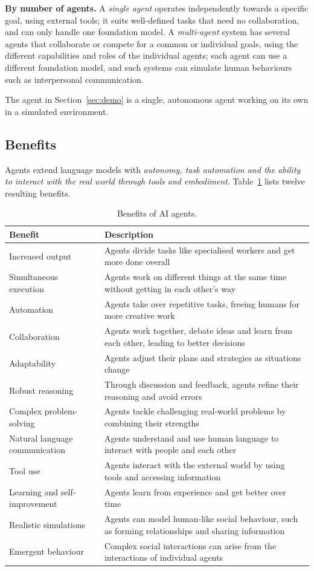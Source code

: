 \documentclass[11pt, a4paper]{article}
\begin{document}
\textbf{By number of agents.} A \emph{single agent} operates independently towards a specific goal, using external tools; it suits well-defined tasks that need no collaboration, and can only handle one foundation model. A \emph{multi-agent} system has several agents that collaborate or compete for a common or individual goals, using the different capabilities and roles of the individual agents; each agent can use a different foundation model, and such systems can simulate human behaviours such as interpersonal communication.

The agent in Section~\ref{sec:demo} is a single, autonomous agent working on its own in a simulated environment.

\subsection{Benefits}

Agents extend language models with \emph{autonomy, task automation and the ability to interact with the real world through tools and embodiment}. Table~\ref{tab:benefits} lists twelve resulting benefits.

\begin{table}[H]
\centering
\small
\caption{Benefits of AI agents.}
\label{tab:benefits}
\begin{tabularx}{\textwidth}{l X}
\toprule
Benefit & Description \\
\midrule
Increased output & Agents divide tasks like specialised workers and get more done overall \\
Simultaneous execution & Agents work on different things at the same time without getting in each other's way \\
Automation & Agents take over repetitive tasks, freeing humans for more creative work \\
Collaboration & Agents work together, debate ideas and learn from each other, leading to better decisions \\
Adaptability & Agents adjust their plans and strategies as situations change \\
Robust reasoning & Through discussion and feedback, agents refine their reasoning and avoid errors \\
Complex problem-solving & Agents tackle challenging real-world problems by combining their strengths \\
Natural language communication & Agents understand and use human language to interact with people and each other \\
Tool use & Agents interact with the external world by using tools and accessing information \\
Learning and self-improvement & Agents learn from experience and get better over time \\
Realistic simulations & Agents can model human-like social behaviour, such as forming relationships and sharing information \\
Emergent behaviour & Complex social interactions can arise from the interactions of individual agents \\
\bottomrule
\end{tabularx}
\end{table}
\end{document}
